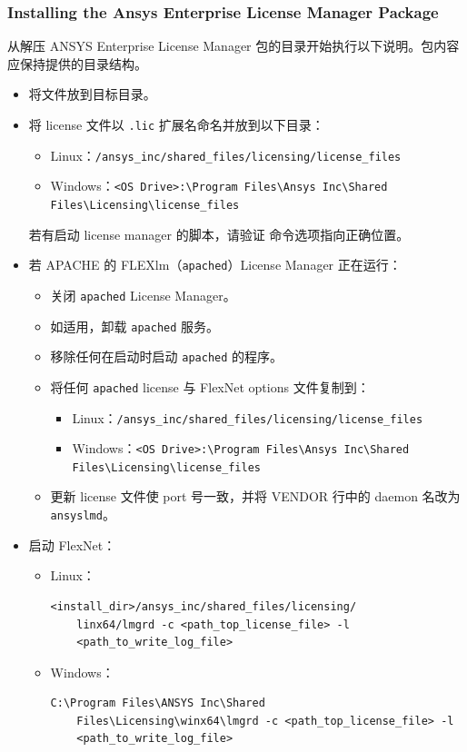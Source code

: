 \subsubsection*{Installing the Ansys Enterprise License Manager Package}

从解压 ANSYS Enterprise License Manager 包的目录开始执行以下说明。包内容应保持提供的目录结构。
\begin{itemize}
  \item 将文件放到目标目录。
  \item 将 license 文件以 \texttt{.lic} 扩展名命名并放到以下目录：
  \begin{itemize}
    \item Linux：\texttt{/ansys\_inc/shared\_files/licensing/license\_files}
    \item Windows：\texttt{<OS Drive>:\textbackslash Program Files\textbackslash Ansys Inc\textbackslash Shared Files\textbackslash Licensing\textbackslash license\_files}
  \end{itemize}
  若有启动 license manager 的脚本，请验证  命令选项指向正确位置。
  \item 若 APACHE 的 FLEXlm（\texttt{apached}）License Manager 正在运行：
  \begin{itemize}
    \item 关闭 \texttt{apached} License Manager。
    \item 如适用，卸载 \texttt{apached} 服务。
    \item 移除任何在启动时启动 \texttt{apached} 的程序。
    \item 将任何 \texttt{apached} license 与 FlexNet options 文件复制到：
    \begin{itemize}
      \item Linux：\texttt{/ansys\_inc/shared\_files/licensing/license\_files}
      \item Windows：\texttt{<OS Drive>:\textbackslash Program Files\textbackslash Ansys Inc\textbackslash Shared Files\textbackslash Licensing\textbackslash license\_files}
    \end{itemize}
    \item 更新 license 文件使 port 号一致，并将 VENDOR 行中的 daemon 名改为 \texttt{ansyslmd}。
  \end{itemize}
  \item 启动 FlexNet：
  \begin{itemize}
    \item Linux：
\begin{lstlisting}
<install_dir>/ansys_inc/shared_files/licensing/
    linx64/lmgrd -c <path_top_license_file> -l
    <path_to_write_log_file>
\end{lstlisting}
    \item Windows：
\begin{lstlisting}
C:\Program Files\ANSYS Inc\Shared
    Files\Licensing\winx64\lmgrd -c <path_top_license_file> -l
    <path_to_write_log_file>
\end{lstlisting}
  \end{itemize}
\end{itemize}

